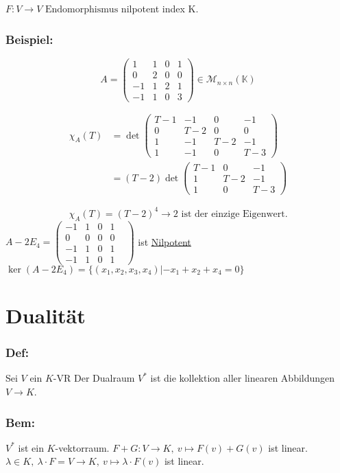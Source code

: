 \documentclass[titlepage,12pt,a4paper,ngerman]{report}
\newcommand{\tx}[1]{\textrm{#1}}
\newcommand{\enph}{F: V \to V \textrm{ Endomorphismus}}
\begin{document}
$ \enph $ nilpotent index K.


\subsection*{Beispiel:}
$$A = \begin{pmatrix}
1 &1&0&1\\0&2&0&0\\-1&1&2&1\\-1&1&0&3
\end{pmatrix} \in \mathcal{M}_{n\times n} (\mathbb{K})$$

\begin{align*} \chi_A(T) &= \det\begin{pmatrix}
T-1 & -1 & 0 & -1\\ 0 & T-2 & 0 & 0 \\ 1 & -1 & T-2 & -1 \\ 1 & -1 & 0 & T-3
\end{pmatrix}\\[8pt]
&= (T-2) \det \begin{pmatrix}
T-1 & 0 & -1 \\ 1 & T-2 & -1 \\ 1 & 0 & T-3
\end{pmatrix}\end{align*}

$$\chi_A (T) = (T-2)^4 \rightarrow 2 \tx{ ist der einzige Eigenwert.}$$
$A-2 E_4 = \begin{pmatrix}
-1&1&0&1\\0&0&0&0&\\-1&1&0&1\\-1&1&0&1
\end{pmatrix}$ ist \underline{\underline{Nilpotent}}\\
$ \ker(A - 2 E_4) = \{(x_1,x_2,x_3,x_4) | -x_1 +x_2 + x_4 = 0\} $


\chapter{Dualität}

\subsection{Def:}
Sei $V$ ein $K$-VR Der Dualraum $V^*$ ist die kollektion aller linearen Abbildungen $V \to K$.
\subsection*{Bem:} $V^*$ ist ein $K$-vektorraum. $F + G: V\to K, \ v\mapsto F(v) + G(v)$ ist linear.\\
$\lambda \in K, \ \lambda \cdot F = V \to K, \ v \mapsto \lambda \cdot F(v)$ ist linear.
\end{document}
